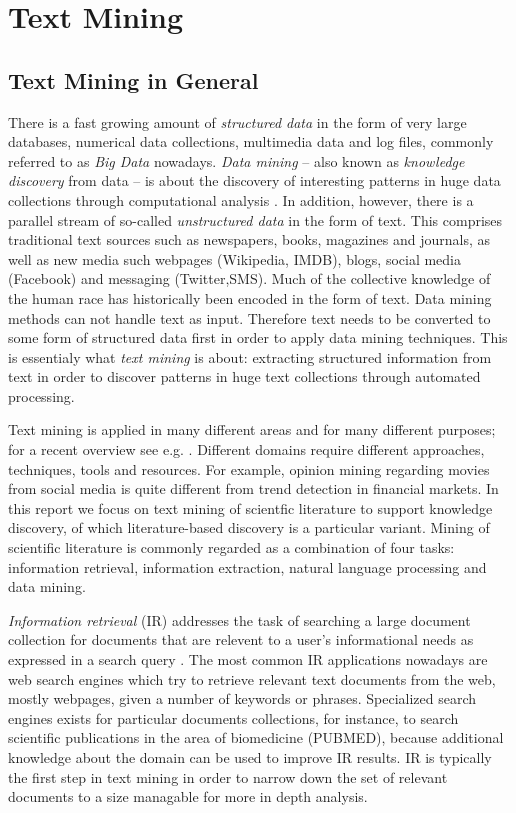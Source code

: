 
\chapter{Text Mining}

\section{Text Mining in General}

There is a fast growing amount of \emph{structured data} in the form of very large databases, numerical data collections, multimedia data and log files, commonly referred to as \emph{Big Data} nowadays.
\emph{Data mining} -- also known as \emph{knowledge discovery} from data -- is about the discovery of interesting patterns in huge data collections through computational analysis \citep{han2006data}.
In addition, however, there is a parallel stream of so-called \emph{unstructured data} in the form of text.
This comprises traditional text sources such as newspapers, books, magazines and journals, as well as new media such webpages (Wikipedia, IMDB), blogs, social media (Facebook) and messaging (Twitter,SMS).
Much of the collective knowledge of the human race has historically been encoded in the form of text. 
Data mining methods can not handle text as input.
Therefore text needs to be converted to some form of structured data first in order to apply data mining techniques.
This is essentialy what \emph{text mining} is about: extracting structured information from text in order to discover patterns in huge text collections through automated processing.

Text mining is applied in many different areas and for many different purposes; for a recent overview see e.g. \citep{Aggarwal2012Mining,Weiss2012Fundamentals}.
Different domains require different approaches, techniques, tools and resources.
For example, opinion mining regarding movies from social media is quite different from trend detection in financial markets. 
In this report we focus on text mining of scientfic literature to support knowledge discovery, of which literature-based discovery is a particular variant.
Mining of scientific literature is commonly regarded as a combination of four tasks: information retrieval, information extraction, natural language processing and data mining.

\emph{Information retrieval} (IR) addresses the task of searching a large document collection for documents that are relevent to a user's informational needs as expressed in a search query \citep{ManningRaghavanSchutze:08}. 
The most common IR applications nowadays are web search engines which try to retrieve relevant text documents from the web, mostly webpages, given a number of keywords or phrases.
Specialized search engines exists for particular documents collections, for instance, to search scientific publications in the area of biomedicine (PUBMED), because additional knowledge about the domain can be used to improve IR results.
IR is typically the first step in text mining in order to narrow down the set of relevant documents to a size managable for more in depth analysis.

